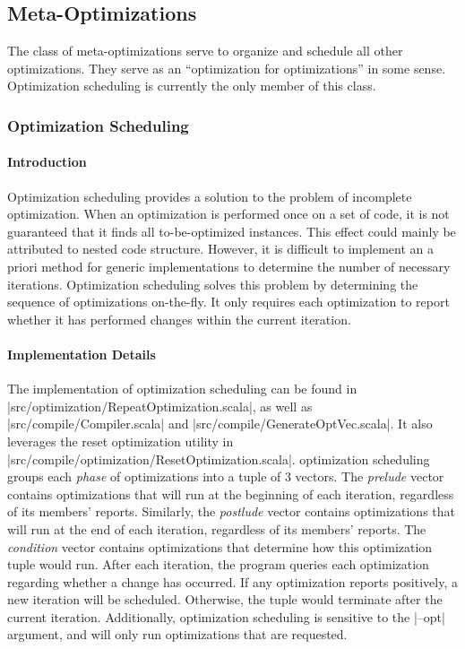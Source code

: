 \subsection{Meta-Optimizations}
The class of meta-optimizations serve to organize and schedule all other optimizations. They serve as an ``optimization for optimizations'' in some sense. Optimization scheduling is currently the only member of this class.

\subsubsection{Optimization Scheduling}

\paragraph{Introduction}

Optimization scheduling provides a solution to the problem of incomplete optimization. When an optimization is performed once on a set of code, it is not guaranteed that it finds all to-be-optimized instances. This effect could mainly be attributed to nested code structure. However, it is difficult to implement an a priori method for generic implementations to determine the number of necessary iterations. Optimization scheduling solves this problem by determining the sequence of optimizations on-the-fly. It only requires each optimization to report whether it has performed changes within the current iteration.

\paragraph{Implementation Details}

The implementation of optimization scheduling can be found in |src/optimization/RepeatOptimization.scala|, as well as |src/compile/Compiler.scala| and |src/compile/GenerateOptVec.scala|. It also leverages the reset optimization utility in |src/compile/optimization/ResetOptimization.scala|. optimization scheduling groups each \textit{phase} of optimizations into a tuple of 3 vectors. The \textit{prelude} vector contains optimizations that will run at the beginning of each iteration, regardless of its members' reports. Similarly, the \textit{postlude} vector contains optimizations that will run at the end of each iteration, regardless of its members' reports. The \textit{condition} vector contains optimizations that determine how this optimization tuple would run. After each iteration, the program queries each optimization regarding whether a change has occurred. If any optimization reports positively, a new iteration will be scheduled. Otherwise, the tuple would terminate after the current iteration. Additionally, optimization scheduling is sensitive to the |--opt| argument, and will only run optimizations that are requested.

